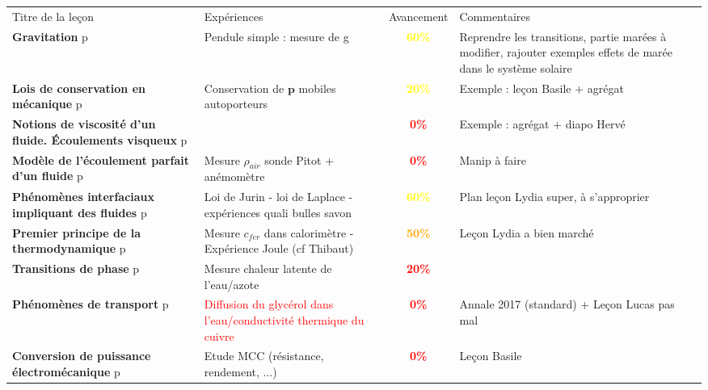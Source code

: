 \begin{changemargin}{-1.5cm}{-0cm}

\begin{center}
\begin{tabularx}{\paperwidth-2cm}{| X | X | c | X |}
  \hline
  \rowcolor{gray!20}\multicolumn{4}{c}{Avancement préparation oraux Leçons Physique} \\
  \hline 
  Titre de la leçon & Expériences & Avancement & Commentaires \\
  \hline
\textbf{Gravitation} p\pageref{LP_Gravitation}  & Pendule simple : mesure de g & \textcolor{yellow}{\textbf{60\%}}  & Reprendre les transitions, partie marées à modifier, rajouter exemples effets de marée dans le système solaire   \\
  \hline 
  \hline
     \textbf{Lois de conservation en mécanique} p\pageref{LP_LoisConservation} & Conservation de $\mathbf{p}$ mobiles autoporteurs  &  \textcolor{yellow}{\textbf{20\%}}  & Exemple : leçon Basile + agrégat \\
  \hline 
    \textbf{Notions de viscosité d'un fluide. \'{E}coulements visqueux} p\pageref{LP_Viscosite} &  & \textcolor{red}{\textbf{0\%}} &  Exemple : agrégat + diapo Hervé   \\
  \hline 
  \textbf{Modèle de l'écoulement parfait d'un fluide} p\pageref{LP_EcoulementParfait} & Mesure $\rho_{air}$ sonde Pitot + anémomètre & \textcolor{red}{\textbf{0\%}} & Manip à faire \\
  \hline
  \textbf{Phénomènes interfaciaux impliquant des fluides} p\pageref{LP_PhenomenesInterfaciaux} & Loi de Jurin - loi de Laplace - expériences quali bulles savon & \textcolor{yellow}{\textbf{60\%}} & Plan leçon Lydia super, à s'approprier\\
  \hline 
  \hline
  \textbf{Premier principe de la thermodynamique} p\pageref{LP_PremierPrincipe} & Mesure $c_{fer}$ dans calorimètre - Expérience Joule (cf Thibaut) & \textcolor{orange}{\textbf{50\%}} & Leçon Lydia a bien marché \\
  \hline 
  \textbf{Transitions de phase} p\pageref{LP_TransitionPhase} & Mesure chaleur latente de l'eau/azote & \textcolor{red}{\textbf{20\%}} & \\
  \hline 
  \textbf{Phénomènes de transport} p\pageref{LP_Transport} & \textcolor{red}{Diffusion du glycérol dans l'eau/conductivité thermique du cuivre}& \textcolor{red}{\textbf{0\%}} & Annale 2017 (standard) + Leçon Lucas pas mal\\
  \hline 
  \hline
  \textbf{Conversion de puissance électromécanique} p\pageref{LP_ConversionPuissance} & Etude MCC (résistance, rendement, ...) & \textcolor{red}{\textbf{0\%}} & Leçon Basile\\

\end{tabularx}
\end{center}
\end{changemargin}
